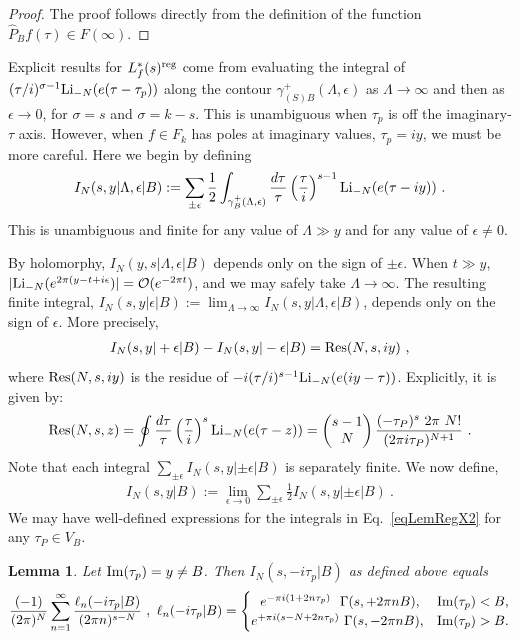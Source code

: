 \documentclass[11pt,a4paper]{article}
\newcommand{\g}{\gamma}
\newcommand{\e}{\epsilon}
\newcommand{\G}{\Gamma}
\newcommand{\La}{\Lambda}
\newcommand{\BM}{\left(\begin{matrix}}
\newcommand{\EM}{\end{matrix}\right)}
\newtheorem{lem}[thm]{Lemma}
\newcommand{\reg}{{\rm reg}}
\newcommand{\PF}{\widehat{P}} 				%
\begin{document}
\begin{proof}
The proof follows directly from the definition of the function $\PF_B f(\tau) \in F(\infty)$.
\end{proof}

Explicit results for $L_f^*(s)^\reg$ come from evaluating the integral of $(\tau/i)^{\sigma-1} {\rm Li}_{-N}(e(\tau-\tau_p))$ along the contour $\g_{(S)B}^+(\La,\e)$ as $\La \to \infty$ and then as $\e \to 0$, for $\sigma = s$ and $\sigma = k-s$. This is unambiguous when $\tau_p$ is off the imaginary-$\tau$ axis. However, when $f \in F_k$ has poles at imaginary values, $\tau_p = i y$, we must be more careful. Here we begin by defining
\begin{align}
I_N(s,y|\La,\e|B):= \sum_{\pm \e} \frac{1}{2} \int_{\g_B^+(\La,\e)} \frac{d\tau}{\tau} \left( \frac{\tau}{i} \right)^{s-1}{\rm Li}_{-N}(e(\tau-i y))~.
\end{align}
This is unambiguous and finite for any value of $\La \gg y$ and for any value of $\e\neq 0$. 

By holomorphy, $I_N(y,s|\La,\e|B)$ depends only on the sign of $\pm\e$. When $t \gg y$, $|{\rm Li}_{-N}(e^{2\pi (y-t+i\e})| = {\cal O}(e^{-2 \pi t})$, and we may safely take $\La \to \infty$. The resulting finite integral, $I_N(s,y|\e|B):= \lim_{\La \to \infty} I_N(s,y|\La,\e|B)$, depends only on the sign of $\e$. More precisely,
\begin{align}
I_N(s,y|+\e|B) - I_N(s,y|-\e|B) = {\rm Res}(N,s,i y) ~,
\end{align}
where ${\rm Res}(N, s, i y)$ is the residue of $-i (\tau/i)^{s-1} {\rm Li}_{-N}(e(iy-\tau))$. Explicitly, it is given by:
\begin{align}
{\rm Res}(N,s,z) = 
\oint \frac{d\tau}{\tau}  \left(\frac{\tau}{i}\right)^{s}{\rm Li}_{-N}(e(\tau-z))= \BM s-1 \\ N \EM \frac{(-\tau_P)^s~2 \pi~N!}{(2 \pi i \tau_P)^{N+1}} ~.\label{eqLemRegX7}
\end{align}
Note that each integral $\sum_{\pm \e}I_N(s,y|\pm\e|B)$ is separately finite. We now define,
\begin{align}
I_N(s,y|B) :=\lim_{\e \to 0} \sum_{\pm \e} \frac{1}{2} I_N(s,y|\pm \e|B)~.
\end{align}
We may have well-defined expressions for the integrals in Eq.~\eqref{eqLemRegX2} for any $\tau_P \in V_B$. 

\begin{lem}\label{LemRegX3}
Let  ${\rm Im}(\tau_p) = y \neq B$. Then $I_N(s,-i\tau_p|B)$ as defined above equals
\begin{align}
\frac{(-1)}{(2\pi)^N}\sum_{n = 1}^{\infty} \frac{ \ell_n(-i \tau_p|B) }{ (2 \pi n)^{s-N} }
~,~
\ell_n(-i\tau_p|B) = 
\begin{cases}
~~e^{-\pi i (1+2 n \tau_p)} ~~ \G(s,+2\pi n B), &{\rm Im}(\tau_p) < B,
\\
e^{+\pi i (s-N+2 n \tau_p)} ~ \G(s, -2\pi n B), &{\rm Im}(\tau_p) > B.
\end{cases}
\label{eqLemRegX3}
\end{align}
\end{lem}
\end{document}
